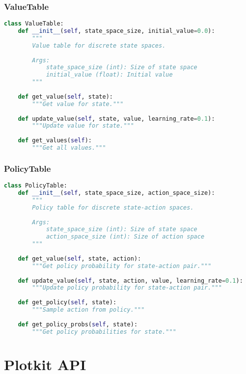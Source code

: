 \subsubsection{ValueTable}

\begin{lstlisting}[language=python]
class ValueTable:
    def __init__(self, state_space_size, initial_value=0.0):
        """
        Value table for discrete state spaces.
        
        Args:
            state_space_size (int): Size of state space
            initial_value (float): Initial value
        """
    
    def get_value(self, state):
        """Get value for state."""
    
    def update_value(self, state, value, learning_rate=0.1):
        """Update value for state."""
    
    def get_values(self):
        """Get all values."""
\end{lstlisting}

\subsubsection{PolicyTable}

\begin{lstlisting}[language=python]
class PolicyTable:
    def __init__(self, state_space_size, action_space_size):
        """
        Policy table for discrete state-action spaces.
        
        Args:
            state_space_size (int): Size of state space
            action_space_size (int): Size of action space
        """
    
    def get_value(self, state, action):
        """Get policy probability for state-action pair."""
    
    def update_value(self, state, action, value, learning_rate=0.1):
        """Update policy probability for state-action pair."""
    
    def get_policy(self, state):
        """Sample action from policy."""
    
    def get_policy_probs(self, state):
        """Get policy probabilities for state."""
\end{lstlisting}

\section{Plotkit API}

